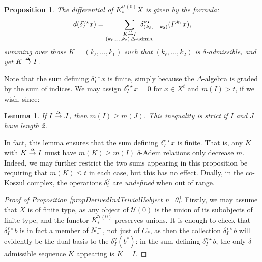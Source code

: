 \documentclass[11pt]{amsart} \renewcommand{\baselinestretch}{1.2}
\theoremstyle{plain}
\newtheorem{lem}[thm]{Lemma}
\newtheorem{prop}[thm]{Proposition}
\numberwithin{equation}{section} %
\theoremstyle{plain}
\newtheorem{lem}[thm]{Lemma}
\newtheorem{prop}[thm]{Proposition}
\numberwithin{equation}{chapter} %
\newcommand{\calU}{\mathcal{U}}
\newcommand{\deltaalg}{\Delta} %
\newcommand{\minDimP}{\overline{m}}
\newcommand{\minDimDelta}{m}
\newcommand{\produces}[3]{#3:#1\sim #2}
\renewcommand{\produces}[3]{#1\rightarrow_{#3} #2}%
\renewcommand{\produces}[3]{#1\overset{\smash{#3}}{\rightarrow} #2}%
\newcommand{\Nop}{N^{\smash{-}}}
\newcommand{\uver}{^\mathrm{v}}
\newcommand{\deltav}{\delta\uver}
\newcommand{\deltavstar}{\delta^{\mathrm{v}\star}}
\begin{document}
\begin{Koszul complexes}
\begin{prop}
The differential of $K^{\calU(0)}_*X$ is given by the formula:
\[d(\deltavstar_Ix)=\sum_{ \substack{\produces{K}{I}{\deltaalg}\\(k_{\ell},\ldots,k_2){\,\deltaalg\textup{-admis.}}}}\!\!\!\!\!\!\!\!\!\!\!\! \deltavstar_{(k_{\ell},\ldots,k_2)}(P^{k_1}x),\]
summing over those $K=(k_{\ell},\ldots,k_1)$ such that $(k_{\ell},\ldots,k_2)$ is $\delta$-admissible, and yet $\produces{K}{I}{\deltaalg}$.
\end{prop}
Note that the sum defining $\deltavstar_Ix$ is finite, simply because the $\Delta$-algebra is graded by the sum of indices.
We may assign $\deltavstar_Ix=0$ for $x\in X^t$ and $\minDimP(I)>t$, if we wish, since:
\begin{lem}
\label{lemOnAdemChangeIn minDimP}
If $\produces{I}{J}{\deltaalg}$, then $\minDimDelta(I)\geq\minDimDelta(J)$. This inequality is strict if $I$ and $J$ have length 2.
\end{lem}
\noindent In fact, this lemma ensures that the sum defining $\deltavstar_Ix$ is finite. That is, any $K$ with $\produces{K}{I}{\Delta}$ must have  $\minDimDelta(K)\geq\minDimDelta(I)$
 $\delta$-Adem relations only decrease $\minDimP$. Indeed, we may further restrict the two sums appearing in this proposition be requiring that $\minDimP(K)\leq t$ in each case, but this has no effect. Dually, in the co-Koszul complex, the operations $\deltav_i$ are \emph{undefined} when out of range.
\begin{proof}[Proof of Proposition \ref{propDerivedIndTrivialUobject n=0}]
Firstly, we may assume that $X$ is  of finite type, as any object of $\calU(0)$ is the union of its  subobjects of finite type, and the functor $K_*^{\calU(0)}$ preserves unions. It is enough to check that $\deltavstar_Ib$ is in fact a member of $\Nop_*$, not just of $C_*$, as then the collection $\deltavstar_Ib$ will evidently be the dual basis to the $\deltav_I(b^*)$: in the sum defining $\deltavstar_Ib$, the only $\delta$-admissible sequence $K$ appearing is $K=I$.  %


\end{proof}
\end{Koszul complexes}
\end{document}
